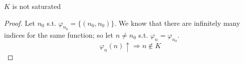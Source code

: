 \begin{corollary}
  $K$ is not saturated
  \begin{proof}
    Let $n_0$ s.t. $\varphi_{n_0} = \{(n_0, n_0)\}$. We know that
    there are infinitely many indices for the same function; so let
    $n \neq n_0$ s.t. $\varphi_n = \varphi_{n_0}$.
    \[
      \varphi_n(n) \uparrow \Rightarrow n \notin K
    \]
  \end{proof}
\end{corollary}
